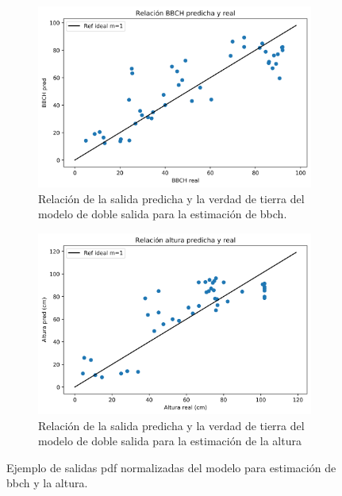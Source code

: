 \begin{figure}[H]
\centering
\begin{subfigure}{\textwidth}
  \centering
  \includegraphics[width=0.95\linewidth]{archivos/tfg/Mean/TEST_PARC_RECTA_bh}
  \caption{Relación de la salida predicha y la verdad de tierra del modelo de doble salida para la estimación de \gls{bbch}. \label{fig:rel_bh_b}}
\end{subfigure}
\begin{subfigure}{\textwidth}
  \centering
  \includegraphics[width=0.95\linewidth]{archivos/tfg/Mean/TEST_PARC_RECTA_bh_H}
  \caption{Relación de la salida predicha y la verdad de tierra del modelo de doble salida para la estimación de la altura\label{fig:rel_bh_h}}
\end{subfigure}
\caption{Ejemplo de salidas \gls{pdf} normalizadas del modelo para estimación de \gls{bbch} y la altura. \label{fig:rel_bh}}
\end{figure}


